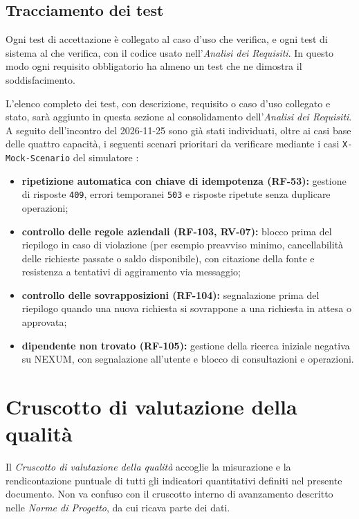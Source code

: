 \documentclass[documento]{gpt}
\begin{document}
\subsection{Tracciamento dei test}
Ogni test di accettazione è collegato al caso d'uso che verifica, e ogni test di sistema al  che verifica, con il codice usato nell'\textit{Analisi dei Requisiti}. In questo modo ogni requisito obbligatorio ha almeno un test che ne dimostra il soddisfacimento.

L'elenco completo dei test, con descrizione, requisito o caso d'uso collegato e stato, sarà aggiunto in questa sezione al consolidamento dell'\textit{Analisi dei Requisiti}. A seguito dell'incontro del 2026-11-25 sono già stati individuati, oltre ai casi base delle quattro capacità, i seguenti scenari prioritari da verificare mediante i casi \texttt{X-Mock-Scenario} del simulatore :
\begin{itemize}
    \item \textbf{ripetizione automatica con chiave di idempotenza (RF-53):} gestione di risposte \texttt{409}, errori temporanei \texttt{503} e risposte ripetute senza duplicare operazioni;
    \item \textbf{controllo delle regole aziendali (RF-103, RV-07):} blocco prima del riepilogo in caso di violazione (per esempio preavviso minimo, cancellabilità delle richieste passate o saldo disponibile), con citazione della fonte e resistenza a tentativi di aggiramento via messaggio;
    \item \textbf{controllo delle sovrapposizioni (RF-104):} segnalazione prima del riepilogo quando una nuova richiesta si sovrappone a una richiesta in attesa o approvata;
    \item \textbf{dipendente non trovato (RF-105):} gestione della ricerca iniziale negativa su NEXUM, con segnalazione all'utente e blocco di consultazioni e operazioni.
\end{itemize}


\section{Cruscotto di valutazione della qualità}
Il \textit{Cruscotto di valutazione della qualità} accoglie la misurazione e la rendicontazione puntuale di tutti gli indicatori quantitativi definiti nel presente documento. Non va confuso con il cruscotto interno di avanzamento descritto nelle \textit{Norme di Progetto}, da cui ricava parte dei dati.
\end{document}
